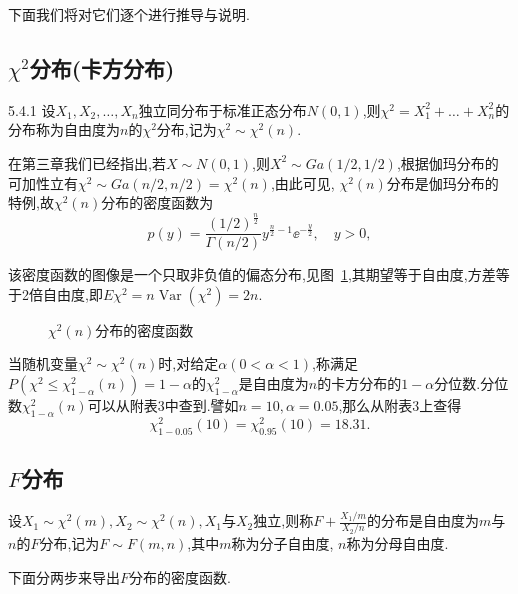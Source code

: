 下面我们将对它们逐个进行推导与说明.
\subsection{$\chi^2$分布(卡方分布)\label{ssec:5.4.1}}
\begin{definition}{}{5.4.1}
设$X_1,X_2,\dotsc,X_n$独立同分布于标准正态分布$N(0,1)$,则$\chi^2=X_1^2+\dotsc+X_n^2$的分布称为自由度为$n$的$\chi^2$分布,记为$\chi^2\sim\chi^2(n)$.
\end{definition}

在第三章我们已经指出,若$X\sim N(0,1)$,则$X^2\sim Ga(1/2,1/2)$,根据伽玛分布的可加性立有$\chi^2\sim Ga(n/2,n/2)=\chi^2(n)$,由此可见, $\chi^2(n)$分布是伽玛分布的特例,故$\chi^2(n)$分布的密度函数为
\[p(y)=\frac{(1/2)^{\frac n2}}{\Gamma(n/2)}y^{\frac n2-1}\ee^{-\frac y2},\quad y>0,\]

该密度函数的图像是一个只取非负值的偏态分布,见图~\ref{fig:5.4.1},其期望等于自由度,方差等于2倍自由度,即$E\chi^2=n\operatorname{Var}(\chi^2)=2n$.
\begin{figure}[!ht]
  \centering
{}
  \caption{$\chi^2(n)$分布的密度函数}\label{fig:5.4.1}
\end{figure}


当随机变量$\chi^2\sim\chi^2(n)$时,对给定$\alpha(0<\alpha<1)$,称满足$P(\chi^2\leq\chi_{1-\alpha}^2(n))=1-\alpha$的$\chi_{1-\alpha}^2$是自由度为$n$的卡方分布的$1-\alpha$分位数.分位数$\chi_{1-\alpha}^2(n)$可以从附表3中查到.譬如$n=10,\alpha=0.05$,那么从附表3上查得
\[\chi_{1-0.05}^2(10)=\chi_{0.95}^2(10)=18.31.\]
\subsection{$F$分布\label{ssec:5.4.2}}
\begin{definition}{}{}
设$X_1\sim\chi^2(m),X_2\sim\chi^2(n),X_1$与$X_2$独立,则称$F+\frac{X_1/m}{X_2/n}$的分布是自由度为$m$与$n$的$F$分布,记为$F\sim F(m,n)$,其中$m$称为分子自由度, $n$称为分母自由度.
\end{definition}
下面分两步来导出$F$分布的密度函数.

